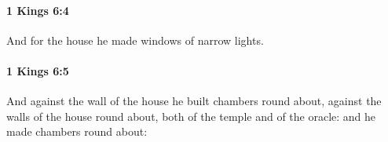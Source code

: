 		\paragraph{1 Kings 6:4} %
			\label{1KINGS-6-4}

			And for the house he made windows of narrow lights.


		\paragraph{1 Kings 6:5} %
			\label{1KINGS-6-5}

			And against the wall of the house he built chambers round about, against the walls of the house round about, both of the temple and of the oracle: and he made chambers round about:


